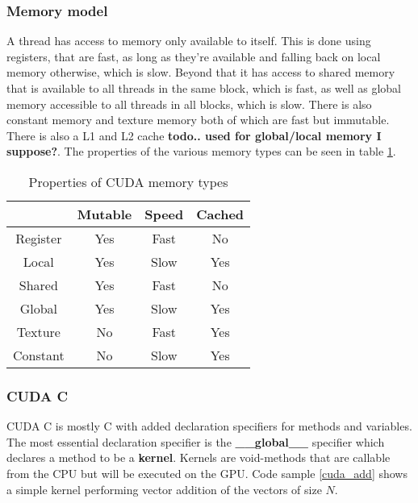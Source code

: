 \subsubsection{Memory model}
A thread has access to memory only available to itself. This is done using registers, that are fast, as long as they're available and falling back on local memory otherwise, which is slow.
Beyond that it has access to shared memory that is available to all threads in the same block, which is fast, as well as global memory accessible to all threads in all blocks, which is slow.
There is also constant memory and texture memory both of which are fast but immutable. 
There is also a L1 and L2 cache \textbf{todo.. used for global/local memory I suppose?}.
The properties of the various memory types can be seen in table \ref{table:memorytypes}.
{\renewcommand{\arraystretch}{3}%
\begin{table}[h!]
\centering
\begin{tabular}{ | c | c | c | c | }
  \hline
           & Mutable & Speed & Cached \\ \hline
  Register & Yes     & Fast  & No     \\ \hline
  Local    & Yes     & Slow  & Yes    \\ \hline
  Shared   & Yes     & Fast  & No     \\ \hline
  Global   & Yes     & Slow  & Yes    \\ \hline
  Texture  & No      & Fast  & Yes    \\ \hline
  Constant & No      & Slow  & Yes    \\ \hline

\end{tabular}
\caption{Properties of CUDA memory types\label{table:memorytypes}}
\end{table}


\subsubsection{CUDA C}
CUDA C is mostly C with added declaration specifiers for methods and variables. The most essential declaration specifier is the \textbf{\_\_global\_\_} specifier which declares a method to be a \textbf{kernel}. Kernels are void-methods that are callable from the CPU but will be executed on the GPU. Code sample \ref{cuda_add} shows a simple kernel performing vector addition of the vectors of size $N$.

}
